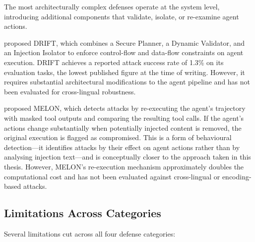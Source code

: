 The most architecturally complex defenses operate at the system level, introducing additional components that validate, isolate, or re-examine agent actions.

\textcite{liao2025drift} proposed DRIFT, which combines a Secure Planner, a Dynamic Validator, and an Injection Isolator to enforce control-flow and data-flow constraints on agent execution.  DRIFT achieves a reported attack success rate of 1.3\% on its evaluation tasks, the lowest published figure at the time of writing.  However, it requires substantial architectural modifications to the agent pipeline and has not been evaluated for cross-lingual robustness.

\textcite{li2025melon} proposed MELON, which detects attacks by re-executing the agent's trajectory with masked tool outputs and comparing the resulting tool calls.  If the agent's actions change substantially when potentially injected content is removed, the original execution is flagged as compromised.  This is a form of behavioural detection---it identifies attacks by their effect on agent actions rather than by analysing injection text---and is conceptually closer to the approach taken in this thesis.  However, MELON's re-execution mechanism approximately doubles the computational cost and has not been evaluated against cross-lingual or encoding-based attacks.

\subsection{Limitations Across Categories}

Several limitations cut across all four defense categories:

